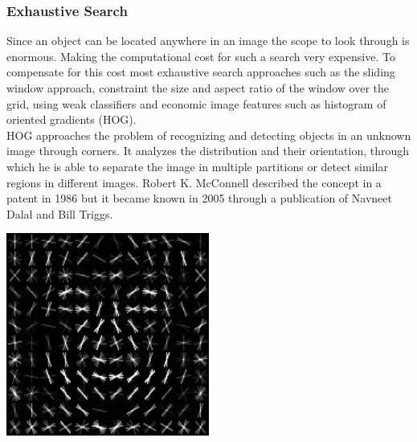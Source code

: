 \subsubsection{Exhaustive Search}
Since an object can be located anywhere in an image the scope to look through is enormous. Making the computational cost for such a search very
expensive. To compensate for this cost most exhaustive search approaches such as the sliding window approach, constraint the size and aspect
ratio of the window over the grid, using weak classifiers and economic image features such as histogram of oriented gradients
(HOG).\cite{selectivesearch} \\
HOG approaches the problem of recognizing and detecting objects in an unknown image through corners. It analyzes the distribution and their
orientation, through which he is able to separate the image in multiple partitions or detect similar regions in different images.
Robert K. McConnell described the concept in a patent in 1986 but it became known in 2005 through a publication of Navneet Dalal and Bill
Triggs.\cite{wiki_hog}
\vspace{0.5cm}
\begin{center}
    \includegraphics[width=0.5\textwidth]{images/object_detection/Dlib_Learned-HOG-Detector.jpg} \cite{wiki_hog}
\end{center}

